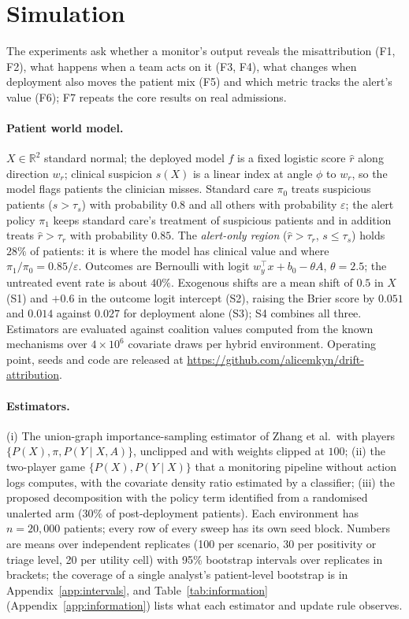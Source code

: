 \documentclass[letterpaper]{article} %
\newcommand{\rhat}{\hat r}
\begin{document}
\section{Simulation}
\label{sec:sim}

The experiments ask whether a monitor's output reveals the misattribution
(F1, F2), what happens when a team acts on it (F3, F4), what changes when
deployment also moves the patient mix (F5) and which metric tracks the
alert's value (F6); F7 repeats the core results on real admissions.

\paragraph{Patient world model.} $X \in \mathbb{R}^2$ standard normal; the
deployed model $f$ is a fixed logistic score $\rhat$ along direction $w_r$;
clinical suspicion $s(X)$ is a linear index at angle $\phi$ to $w_r$, so the
model flags patients the clinician misses. Standard care $\pi_0$ treats
suspicious patients ($s > \tau_s$) with probability $0.8$ and all others with
probability $\varepsilon$; the alert policy $\pi_1$ keeps standard care's
treatment of suspicious patients and in addition treats $\rhat > \tau_r$
with probability $0.85$. The \emph{alert-only region} ($\rhat > \tau_r$,
$s \le \tau_s$) holds $28\%$ of patients: it is where the model has clinical
value and where $\pi_1 / \pi_0 = 0.85 / \varepsilon$. Outcomes are Bernoulli
with logit $w_y^\top x + b_0 - \theta A$, $\theta = 2.5$; the untreated event
rate is about $40\%$. Exogenous shifts are a mean shift of $0.5$ in $X$ (S1)
and $+0.6$ in the outcome logit intercept (S2), raising the Brier score by
$0.051$ and $0.014$ against $0.027$ for deployment alone (S3); S4 combines all
three. Estimators are evaluated against coalition values computed from the
known mechanisms over $4 \times 10^6$ covariate draws per hybrid environment.
Operating point, seeds and code are released at
\url{https://github.com/alicemkyn/drift-attribution}.

\paragraph{Estimators.} (i) The union-graph importance-sampling estimator of
Zhang et al.\ with players $\{P(X), \pi, P(Y \mid X, A)\}$, unclipped and with
weights clipped at $100$; (ii) the two-player game $\{P(X), P(Y \mid X)\}$
that a monitoring pipeline without action logs computes, with the covariate
density ratio estimated by a classifier; (iii) the proposed decomposition with
the policy term identified from a randomised unalerted arm ($30\%$ of
post-deployment patients). Each environment has $n = 20{,}000$ patients; every
row of every sweep has its own seed block. Numbers are means over independent
replicates (100 per scenario, 30 per positivity or triage level, 20 per
utility cell) with 95\% bootstrap intervals over replicates in brackets;
the coverage of a single analyst's patient-level bootstrap is in
Appendix~\ref{app:intervals}, and Table~\ref{tab:information} (Appendix~\ref{app:information}) lists what
each estimator and update rule observes.
\end{document}
